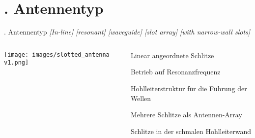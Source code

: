 \documentclass[
  aspectratio=169, %
]{beamer}
\begin{document}
\section{\thesection. Antennentyp}
\begin{frame}{\thesection. Antennentyp}
\vspace{-0.5em} %
\textit{[In-line] [resonant] [waveguide] [slot array] [with narrow-wall slots]}
\begin{columns}[T,onlytextwidth]

    \begin{column}{0.5\textwidth}
        \centering
        \texttt{[image: images/slotted\_antenna v1.png]}
        \label{fig:slotted_fusion}
    \end{column}

    \begin{column}{0.5\textwidth}

       \begin{description}[]
            \item[\textbf{In-line}] Linear angeordnete Schlitze
            \item[\textbf{Resonant}] Betrieb auf Resonanzfrequenz
            \item[\textbf{Waveguide}] Hohlleiterstruktur für die Führung der Wellen
            \item[\textbf{Slot array}] Mehrere Schlitze als Antennen-Array
            \item[\textbf{Narrow-wall slots}] Schlitze in der schmalen Hohlleiterwand
        \end{description}

    \end{column}

\end{columns}
\end{frame}
\end{document}
